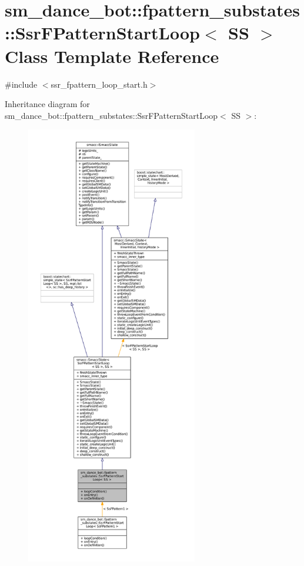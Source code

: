 \hypertarget{structsm__dance__bot_1_1fpattern__substates_1_1SsrFPatternStartLoop}{}\section{sm\+\_\+dance\+\_\+bot\+:\+:fpattern\+\_\+substates\+:\+:Ssr\+F\+Pattern\+Start\+Loop$<$ SS $>$ Class Template Reference}
\label{structsm__dance__bot_1_1fpattern__substates_1_1SsrFPatternStartLoop}


{\ttfamily \#include $<$ssr\+\_\+fpattern\+\_\+loop\+\_\+start.\+h$>$}



Inheritance diagram for sm\+\_\+dance\+\_\+bot\+:\+:fpattern\+\_\+substates\+:\+:Ssr\+F\+Pattern\+Start\+Loop$<$ SS $>$\+:
\nopagebreak
\begin{figure}[H]
\begin{center}
\leavevmode
\includegraphics[height=550pt]{structsm__dance__bot_1_1fpattern__substates_1_1SsrFPatternStartLoop__inherit__graph}
\end{center}
\end{figure}


